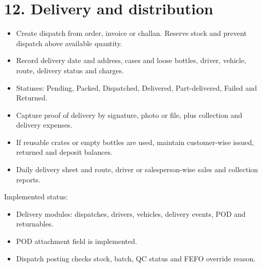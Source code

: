 \documentclass[11pt]{article}
\begin{document}
\section{12. Delivery and distribution}
\begin{itemize}[leftmargin=*,itemsep=2pt,topsep=2pt]
\item Create dispatch from order, invoice or challan. Reserve stock and prevent dispatch above available quantity.
\item Record delivery date and address, cases and loose bottles, driver, vehicle, route, delivery status and charges.
\item Statuses: Pending, Packed, Dispatched, Delivered, Part-delivered, Failed and Returned.
\item Capture proof of delivery by signature, photo or file, plus collection and delivery expenses.
\item If reusable crates or empty bottles are used, maintain customer-wise issued, returned and deposit balances.
\item Daily delivery sheet and route, driver or salesperson-wise sales and collection reports.
\end{itemize}
Implemented status:
\begin{itemize}[leftmargin=*,itemsep=2pt,topsep=2pt]
\item Delivery modules: dispatches, drivers, vehicles, delivery events, POD and returnables.
\item POD attachment field is implemented.
\item Dispatch posting checks stock, batch, QC status and FEFO override reason.
\end{itemize}
\clearpage
\end{document}
